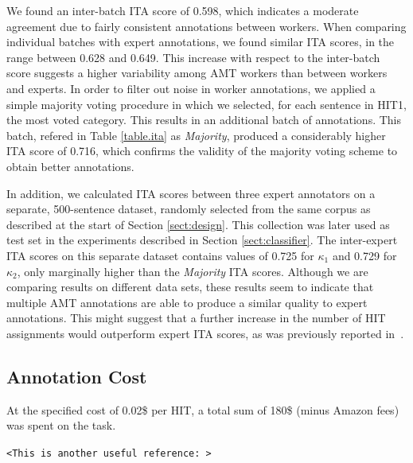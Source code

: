 \documentclass[11pt,letterpaper]{article}
\begin{document}
We found an inter-batch ITA score of 0.598, which indicates a moderate agreement due to fairly consistent annotations between workers. When comparing individual batches with expert annotations, we found similar ITA scores, in the range between 0.628 and 0.649. This increase with respect to the inter-batch score suggests a higher variability among AMT workers than between workers and experts. 
In order to filter out noise in worker annotations, we applied a simple majority voting procedure in which we selected, for each sentence in HIT1, the most voted category. This results in an additional batch of annotations. This batch, refered in Table \ref{table.ita} as \textit{Majority}, produced a considerably higher ITA score of 0.716, which confirms the validity of the majority voting scheme to obtain better annotations.

In addition, we calculated ITA scores between three expert annotators on a separate, 500-sentence dataset, randomly selected from the same corpus as described at the start of Section \ref{sect:design}. This collection was later used as test set in the experiments described in Section \ref{sect:classifier}. The inter-expert ITA scores on this separate dataset contains values of 0.725 for $\kappa_{1}$ and 0.729 for $\kappa_{2}$, only marginally higher than the \textit{Majority} ITA scores. Although we are comparing results on different data sets, these results seem to indicate that multiple AMT annotations are able to produce a similar quality to expert annotations. This might suggest that a further increase in the number of HIT assignments would outperform expert ITA scores, as was previously reported in~\cite{snow_cheap_2008}.

\subsection{Annotation Cost}

At the specified cost of 0.02\$ per HIT, a total sum of 180\$ (minus Amazon fees) was spent on the task.



\texttt{<This is another useful reference: \cite{mason_financial_2009}>}
\end{document}
